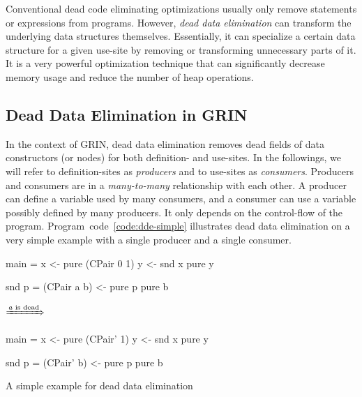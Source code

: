 \documentclass[main.tex]{subfiles}
\begin{document}
	
	
	Conventional dead code eliminating optimizations usually only remove statements or expressions from programs. However, \emph{dead data elimination} can transform the underlying data structures themselves. Essentially, it can specialize a certain data structure for a given use-site by removing or transforming unnecessary parts of it. It is a very powerful optimization technique that can significantly decrease memory usage and reduce the number of heap operations.
	
	\subsection{Dead Data Elimination in GRIN}
	
	In the context of GRIN, dead data elimination removes dead fields of data constructors (or nodes) for both definition- and use-sites. In the followings, we will refer to definition-sites as \emph{producers} and to use-sites as \emph{consumers}. Producers and consumers are in a \emph{many-to-many} relationship with each other. A producer can define a variable used by many consumers, and a consumer can use a variable possibly defined by many producers. It only depends on the control-flow of the program. Program~code~\ref{code:dde-simple} illustrates dead data elimination on a very simple example with a single producer and a single consumer.
	
	\begin{codeFloat}[h]
		\begin{center}
			\begin{minipage}{0.35\textwidth}
				\begin{haskell}
					main = 
					  x <- pure (CPair 0 1)
					  y <- snd x
					  pure y 
					
					snd p =
					  (CPair a b) <- pure p
					  pure b
				\end{haskell}
			\end{minipage}
			$\xRightarrow{\text{\emph{a} is dead}}$
			\begin{minipage}{0.35\textwidth}
				\begin{haskell}
					main = 
					  x <- pure (CPair' 1)
					  y <- snd x
					  pure y 
					
					snd p =
					  (CPair' b) <- pure p
					  pure b
				\end{haskell}
			\end{minipage}
		\end{center}
		\caption{A simple example for dead data elimination}
		\label{code:dde-simple}
	\end{codeFloat}
\end{document}
